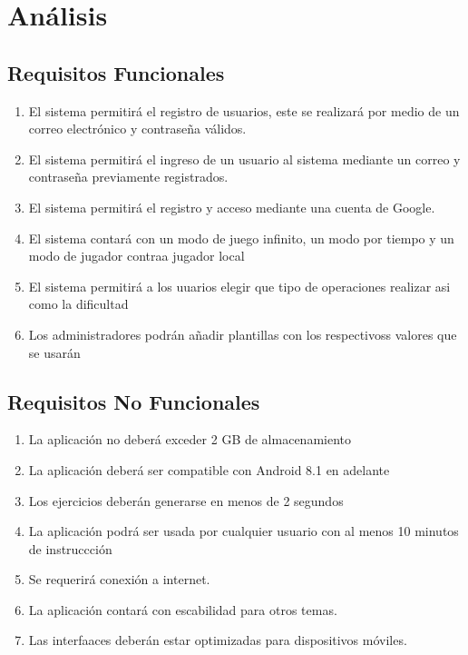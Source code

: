 \documentclass{article}
\begin{document}
\section{Análisis}
\subsection{Requisitos Funcionales}
\begin{enumerate}
\item {El sistema permitirá el registro de usuarios, este se realizará por medio de un correo electrónico y contraseña válidos.}
\item{El sistema permitirá el ingreso de un usuario al sistema mediante un correo y contraseña  previamente registrados.}
\item {El sistema permitirá el registro y acceso mediante una cuenta de Google.}
\item {El sistema contará con un modo de juego infinito, un modo por tiempo y un modo de jugador contraa jugador local}
\item{El sistema permitirá a los uuarios elegir que tipo de operaciones realizar asi como la dificultad}
\item{Los administradores podrán añadir plantillas con los respectivoss valores que se usarán}
\end{enumerate}
\subsection{Requisitos No Funcionales}
\begin{enumerate}
\item {La aplicación no deberá exceder 2 GB de almacenamiento}
\item {La aplicación deberá ser compatible con Android 8.1 en adelante}
\item {Los ejercicios deberán generarse en menos de 2 segundos}
\item {La aplicación podrá ser usada por cualquier usuario con al menos 10 minutos de instruccción}
\item {Se requerirá conexión a internet.}
\item {La aplicación contará con escabilidad para otros temas.}
\item {Las interfaaces deberán estar optimizadas para dispositivos móviles.}
\end{enumerate}
\end{document}
